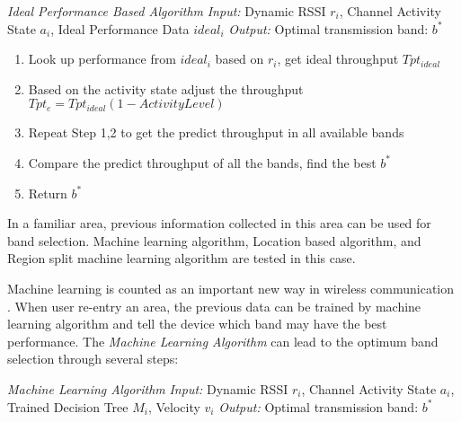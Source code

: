 \emph{Ideal Performance Based Algorithm}
\emph{Input:} Dynamic RSSI $r_i$, Channel Activity State $a_i$, Ideal Performance Data $ideal_i$ 
\emph{Output:} Optimal transmission band: $b^*$

\begin{enumerate}
\item Look up performance from $ideal_i$ based on $r_i$, get ideal throughput $Tpt_{ideal}$
\item Based on the activity state adjust the throughput $Tpt_e=Tpt_{ideal}(1-Activity Level)$
\item Repeat Step 1,2 to get the predict throughput in all available bands
\item Compare the predict throughput of all the bands, find the best $b^*$
\item Return $b^*$
\end{enumerate}

%
In a familiar area, previous information collected in this area can be used for band selection. Machine learning algorithm, Location based algorithm, and Region split machine learning algorithm are tested in this case.

Machine learning is counted as an important new way in wireless communication \cite{haykin2005cognitive}. When user re-entry an area, the previous data can be trained by machine learning algorithm and tell the device which band may have the best performance.
The \emph{Machine Learning Algorithm} can lead to the optimum band selection through several steps:

\emph{Machine Learning Algorithm}
\emph{Input:} Dynamic RSSI $r_i$, Channel Activity State $a_i$, Trained Decision Tree $M_i$, Velocity $v_i$ 
\emph{Output:} Optimal transmission band: $b^*$

